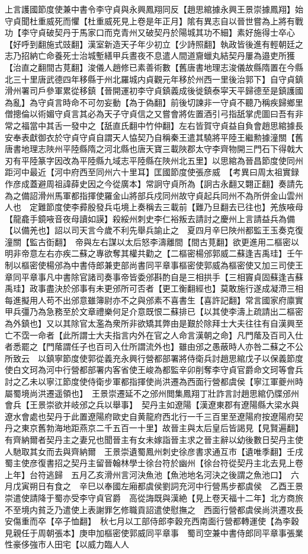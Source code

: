 上言護國節度使兼中書令李守貞與永興鳳翔同反【趙思綰據永興王景崇據鳳翔】始守貞聞杜重威死而懼【杜重威死見上卷是年正月】隂有異志自以晉世嘗為上將有戰功【李守貞破契丹于馬家口而克青州又破契丹於陽城其功不細】素好施得士卒心【好呼到翻施式豉翻】漢室新造天子年少初立【少詩照翻】執政皆後進有輕朝廷之志乃招納亡命養死士治城塹繕甲兵晝夜不息遣人間道齎蠟丸結契丹屢為邉吏所獲【治直之翻間古莧翻】浚儀人趙修已素善術數【舊唐書地理志浚儀故縣隋置在今縣北三十里唐武德四年移縣于州北羅城内貞觀元年移於州西一里後治郭下】自守貞鎮滑州署司戶參軍累從移鎮【晉開運初李守貞鎮義成後徙鎮泰寜天平歸德至是鎮護國為亂】為守貞言時命不可勿妄動【為于偽翻】前後切諫非一守貞不聽乃稱疾歸鄉里僧摠倫以術媚守貞言其必為天子守貞信之又嘗會將佐置酒引弓指舐掌虎圖曰吾有非常之福當中其舌一發中之【舐直氏翻中竹仲翻】左右皆賀守貞益自負會趙思綰據長安奉表獻御衣於守貞守貞自謂天人恊契乃自稱秦王遣其驍將平陸王繼勲據潼關【舊唐書地理志陜州平陸縣隋之河北縣也唐天寶三載陜郡太守李齊物開三門石下得戟大刃有平陸篆字因改為平陸縣九域志平陸縣在陜州北五里】以思綰為晉昌節度使同州距河中最近【河中府西至同州六十里耳】匡國節度使張彦威　【考異曰周太祖實録作彦成蓋避周祖諱薛史因之今從廣本】常詗守貞所為【詗古永翻又翾正翻】奏請先為之備詔滑州馬軍都指揮使羅金山將部兵戍同州故守貞起兵同州不為所併金山雲州人也　定難節度使李彛殷發兵屯境上奏稱去三載前【難乃旦翻去已往也】羌族㖡母【龍龕手鏡㖡音夜母讀如謨】殺綏州刺史李仁裕叛去請討之慶州上言請益兵為備【以備羌也】詔以司天言今歲不利先舉兵諭止之　夏四月辛巳陜州都監王玉奏克復潼關【監古衘翻】　帝與左右謀以太后怒李濤離間【間古莧翻】欲更進用二樞密以明非帝意左右亦疾二蘇之專欲奪其權共勸之【二樞密楊邠郭威二蘇逢吉禹珪】壬午制以樞密使楊邠為中書侍郎兼吏部尚書同平章事樞密使郭威為樞密使又加三司使王章同平章事凡中書除官諸司奏事帝皆委邠斟酌自是三相拱手【三相竇貞固蘇逢吉蘇禹珪】政事盡決於邠事有未更邠所可否者【更工衡翻經也】莫敢施行遂成凝滯三相每進擬用人苟不出邠意雖簿尉亦不之與邠素不喜書生【喜許記翻】常言國家府廪實甲兵彊乃為急務至於文章禮樂何足介意既恨二蘇排已【以其使李濤上疏請出二樞密為外鎮也】又以其除官太濫為衆所非欲矯其弊由是艱於除拜士大夫往往有自漢興至亡不霑一命者【此所謂士大夫指言内外在官之人命言漢朝之命】凡門䕃及百司入仕者悉罷之【門䕃謂任子也百司入仕所謂流外也】雖由邠之愚蔽時人亦咎二蘇之不公所致云　以鎮寧節度使郭從義充永興行營都部署將侍衛兵討趙思綰戊子以保義節度使白文珂為河中行營都部署内客省使王峻為都監辛卯削奪李守貞官爵命文珂等會兵討之乙未以寧江節度使侍衛步軍都指揮使尚洪遷為西面行營都虞侯【寧江軍夔州時屬蜀境尚洪遷遥領也】　王景崇遷延不之邠州閲集鳳翔丁壯詐言討趙思綰仍牒邠州會兵【王景崇欲并岐邠之兵以舉事】　契丹主如遼陽【漢遼東郡有遼陽縣大梁水與遼水會處也契丹于此置遼陽府歐史自黄龍府西北行一千三百里至遼陽府按遼陽府契丹之東京舊勃海地距燕京二千五百一十里】故晉主與太后皇后皆謁見【見賢遍翻】有齊納爾者契丹主之妻兄也聞晉主有女未嫁詣晉主求之晉主辭以幼後數日契丹主使人馳取其女而去與齊納爾　王景崇遺蜀鳳州刺史徐彦書求通互市【遺唯季翻】壬戌蜀主使彦復書招之契丹主留晉翰林學士徐台符於幽州【徐台符從契丹主北去見上卷上年】台符逃歸　五月乙亥滑州言河決魚池【魚池地名河決之後謂之魚池口】　六月戊寅朔日有食之　辛巳以奉國左廂都虞侯劉詞充河中行營馬步都虞侯　乙酉王景崇遣使請降于蜀亦受李守貞官爵　高從誨既與漢絶【見上卷天福十二年】北方商旅不至境内貧乏乃遣使上表謝罪乞修職貢詔遣使慰撫之　西面行營都虞侯尚洪遷攻長安傷重而卒【卒子恤翻】　秋七月以工部侍郎李穀充西南面行營都轉運使【為李穀見親任于周朝張本】庚申加樞密使郭威同平章事　蜀司空兼中書侍郎同平章事張業性豪侈強市人田宅【以威力臨人人